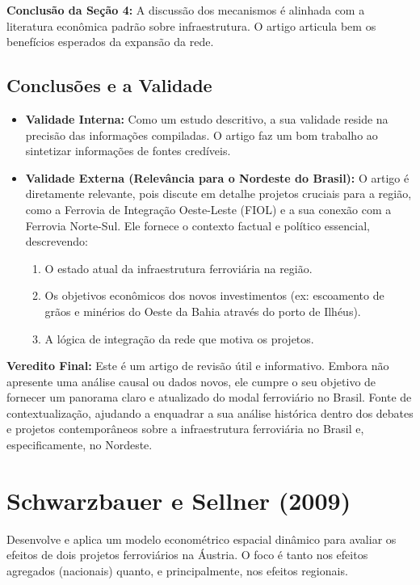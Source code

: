 \documentclass[12pt, a4paper]{article}
\begin{document}
\noindent\textbf{Conclusão da Seção 4:} A discussão dos mecanismos é alinhada com a literatura econômica padrão sobre infraestrutura. O artigo articula bem os benefícios esperados da expansão da rede.

\subsection{Conclusões e a Validade}
\begin{itemize}
    \item \textbf{Validade Interna:} Como um estudo descritivo, a sua validade reside na precisão das informações compiladas. O artigo faz um bom trabalho ao sintetizar informações de fontes credíveis.
    \item \textbf{Validade Externa (Relevância para o Nordeste do Brasil):} O artigo é diretamente relevante, pois discute em detalhe projetos cruciais para a região, como a Ferrovia de Integração Oeste-Leste (FIOL) e a sua conexão com a Ferrovia Norte-Sul. Ele fornece o contexto factual e político essencial, descrevendo:
        \begin{enumerate}
            \item O estado atual da infraestrutura ferroviária na região.
            \item Os objetivos econômicos dos novos investimentos (ex: escoamento de grãos e minérios do Oeste da Bahia através do porto de Ilhéus).
            \item A lógica de integração da rede que motiva os projetos.
        \end{enumerate}
\end{itemize}

\noindent\textbf{Veredito Final:} Este é um artigo de revisão útil e informativo. Embora não apresente uma análise causal ou dados novos, ele cumpre o seu objetivo de fornecer um panorama claro e atualizado do modal ferroviário no Brasil. Fonte de contextualização, ajudando a enquadrar a sua análise histórica dentro dos debates e projetos contemporâneos sobre a infraestrutura ferroviária no Brasil e, especificamente, no Nordeste.

\section{Schwarzbauer e Sellner (2009)}
Desenvolve e aplica um modelo econométrico espacial dinâmico para avaliar os efeitos de dois projetos ferroviários na Áustria. O foco é tanto nos efeitos agregados (nacionais) quanto, e principalmente, nos efeitos regionais.
\end{document}
